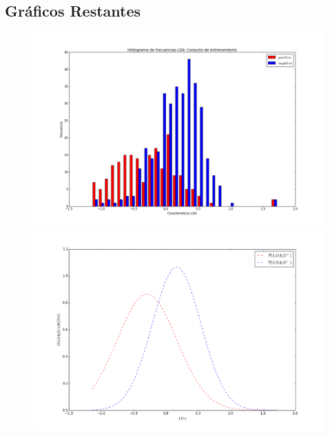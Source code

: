 \documentclass[letter, titlepage, 10pt]{article}
\begin{document}
\newpage
\begin{appendices}
  \renewcommand\thetable{\thesection\arabic{table}}
  \renewcommand\thefigure{\thesection\arabic{figure}}

  \section{Gráficos Restantes} 

  \begin{figure}[H]
  \centering
    \begin{minipage}{.5\textwidth}
        \centering
        \includegraphics[width=1\linewidth]{images/Histograma_D3}
    \end{minipage}%
    \begin{minipage}{.5\textwidth}
        \centering
        \includegraphics[width=1\linewidth]{images/PDF_D3}
    \end{minipage}
\end{figure}


\end{appendices}
\end{document}
